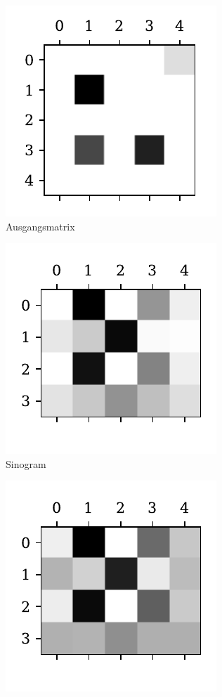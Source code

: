 \documentclass[slug=PET, room=Andreas-Schubert-Bau\,\ 424A, supervisor=Carsten\ Bittrich, coursedate=10.\ 01.\ 2020]{../../Lab_Report_LaTeX/lab_report}
\begin{document}
\begin{figure}[htp]
  \centering
  \begin{subfigure}[t]{.25\textwidth}
    \centering
    \includegraphics[width=.6\textwidth]{../auswertung/figs/theory/source.pdf}
    \caption{Ausgangsmatrix}
    \label{fig:theory-source}
  \end{subfigure}
  \begin{subfigure}[t]{.25\textwidth}
    \centering
    \includegraphics[width=.6\textwidth]{../auswertung/figs/theory/projection.pdf}
    \caption{Sinogram}
    \label{fig:theory-projection}
  \end{subfigure}
  \begin{subfigure}[t]{.25\textwidth}
    \centering
    \includegraphics[width=.6\textwidth]{../auswertung/figs/theory/convoluted.pdf}

\end{subfigure}
\end{figure}
\end{document}
